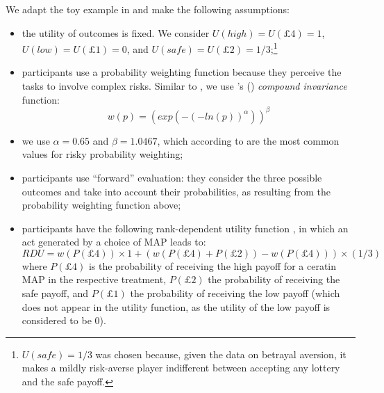 We adapt the toy example in \cite{Li2020a} and make the following assumptions:
\begin{itemize}
\item the utility of outcomes is fixed. We consider $U(high) = U(\pounds4) = 1$, $U(low) = U(\pounds1) = 0$, and $U(safe) = U(\pounds2) = 1/3$;\footnote{
%
$U(safe)=1/3$ was chosen because, given the data on betrayal aversion, it makes a mildly risk-averse player indifferent between accepting any lottery and the safe payoff.
}
\item participants use a probability weighting function because they perceive the tasks to involve complex risks. Similar to \cite{Li2020a}, we use \citeauthor{Prelec1998}'s (\citeyear{Prelec1998}) \textit{compound invariance} function:
$$w(p) = (exp(-(-ln(p))^\alpha))^\beta$$ 
\item we use $\alpha = 0.65$ and $\beta = 1.0467$, which according to \cite{Li2020a} are the most common values for risky probability weighting;
\item participants use ``forward'' evaluation: they consider the three possible outcomes and take into account their probabilities, as resulting from the probability weighting function above;
\item participants have the following rank-dependent utility function \citep{Schmeidler1989}, in which an act generated by a choice of MAP leads to:
$$RDU = w(P(\pounds4)) \times 1 + (w(P(\pounds4) + P(\pounds2)) - w(P(\pounds4))) \times (1/3)$$
where $P(\pounds4)$ is the probability of receiving the high payoff for a ceratin MAP in the respective treatment, $P(\pounds2)$ the probability of receiving the safe payoff, and $P(\pounds1)$ the probability of receiving the low payoff (which does not appear in the utility function, as the utility of the low payoff is considered to be 0).
\end{itemize}

